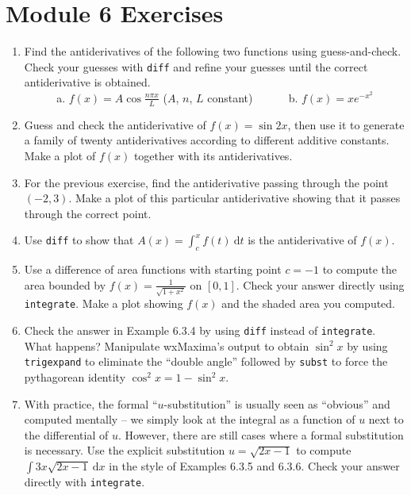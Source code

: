 \documentclass[10.5pt,twoside]{report}
\theoremstyle{definition}
\begin{document}
\pagebreak



\section{Module 6 Exercises}\label{Module 6 Exercises}

\begin{enumerate}

\item Find the antiderivatives of the following two functions using guess-and-check. Check your guesses with \verb|diff| and refine your guesses until the correct antiderivative is obtained.\\

\verb|     | a. $f(x)=A\cos{\frac{n \pi x}{L}}$ ($A$, $n$, $L$ constant)
\verb|     | b. $f(x)=xe^{-x^2}$

\item  Guess and check the antiderivative of $f(x)=\sin{2x}$, then use it to generate a family of twenty antiderivatives according to different additive constants.  Make a plot of $f(x)$ together with its antiderivatives.

\item  For the previous exercise, find the antiderivative passing through the point $(-2,3)$.  Make a plot of this particular antiderivative showing that it passes through the correct point.


\item Use \verb|diff| to show that $A(x)=\displaystyle \int_c^x f(t) \ \mathrm{d}t$ is the antiderivative of $f(x)$.

\item  Use a difference of area functions with starting point $c=-1$ to compute the area bounded by $f(x)=\frac{1}{\sqrt{1+x^2}}$ on $[0,1]$.  Check your answer directly using \verb|integrate|. Make a plot showing $f(x)$ and the shaded area you computed.

\item Check the answer in Example 6.3.4 by using \verb|diff| instead of \verb|integrate|.  What happens?  Manipulate wxMaxima's output to obtain $\sin^2{x}$ by using \verb|trigexpand| to eliminate the ``double angle'' followed by \verb|subst| to force the pythagorean identity $\cos^2{x}=1-\sin^2{x}$.

\item With practice, the formal ``$u$-substitution'' is usually seen as ``obvious'' and computed mentally -- we simply look at the integral as a function of $u$ next to the differential of $u$.  However, there are still cases where a formal substitution is necessary.  Use the explicit substitution $u=\sqrt{2x-1}$ to compute $\displaystyle \int 3x\sqrt{2x-1} \ \mathrm{d}x$ in the style of Examples 6.3.5 and 6.3.6.  Check your answer directly with \verb|integrate|.




\end{enumerate}
\end{document}
